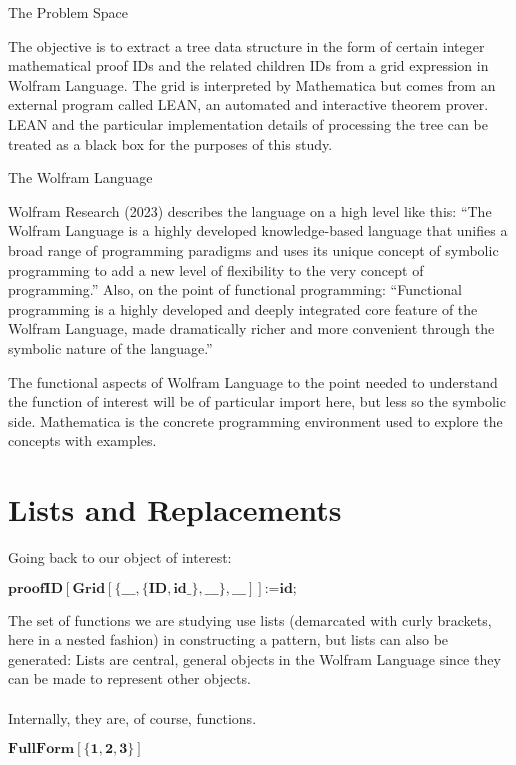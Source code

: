 \documentclass{article}
\begin{document}
The Problem Space

The objective is to extract a tree data structure in the form of certain integer mathematical proof IDs and the related children IDs from a grid
expression in Wolfram Language. The grid is interpreted by Mathematica but comes from an external program called LEAN, an automated and interactive
theorem prover. LEAN and the particular implementation details of processing the tree can be treated as a black box for the purposes of this study.

The Wolfram Language

Wolfram Research (2023) describes the language on a high level like this: {``}The Wolfram Language is a highly developed knowledge-based language
that unifies a broad range of programming paradigms and uses its unique concept of symbolic programming to add a new level of flexibility to the
very concept of programming.{''} Also, on the point of functional programming: {``}Functional programming is a highly developed and deeply integrated
core feature of the Wolfram Language, made dramatically richer and more convenient through the symbolic nature of the language.{''}

The functional aspects of Wolfram Language to the point needed to understand the function of interest will be of particular import here, but less
so the symbolic side. Mathematica is the concrete programming environment used to explore the concepts with examples.

\section*{Lists and Replacements}

Going back to our object of interest:

\begin{doublespace}
\noindent\(\pmb{\text{proofID}[\text{Grid}[\{\_\_\_,\{\text{ID},\text{id$\_$}\},\_\_\_\},\_\_\_]]\text{:=}\text{id};}\)
\end{doublespace}

The set of functions we are studying use lists (demarcated with curly brackets, here in a nested fashion) in constructing a pattern, but lists can
also be generated: Lists are central, general objects in the Wolfram Language since they can be made to represent other objects. \\
\\
Internally, they are, of course, functions.

\begin{doublespace}
\noindent\(\pmb{\text{FullForm}[\{1,2,3\}]}\)
\end{doublespace}
\end{document}
